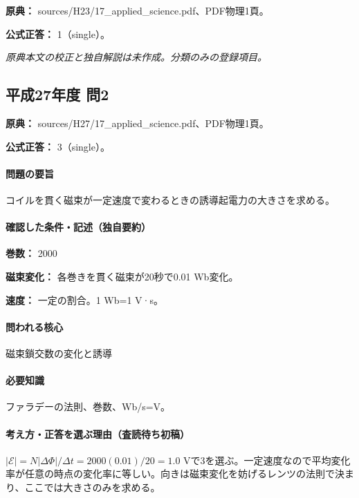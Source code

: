 \noindent\textbf{原典：} sources/H23/17\_applied\_science.pdf、PDF物理1頁。

\textbf{公式正答：} 1（single）。

\par\textit{原典本文の校正と独自解説は未作成。分類のみの登録項目。}

\subsection{平成27年度 問2}
\label{q:h27-reg-applied-02}

\noindent\textbf{原典：} sources/H27/17\_applied\_science.pdf、PDF物理1頁。

\textbf{公式正答：} 3（single）。

\paragraph{問題の要旨} コイルを貫く磁束が一定速度で変わるときの誘導起電力の大きさを求める。

\paragraph{確認した条件・記述（独自要約）}\mbox{}\par

\noindent\textbf{巻数：} 2000\par

\noindent\textbf{磁束変化：} 各巻きを貫く磁束が20秒で0.01 Wb変化。\par

\noindent\textbf{速度：} 一定の割合。1 Wb=\allowbreak{}1 V·s。\par

\paragraph{問われる核心} 磁束鎖交数の変化と誘導

\paragraph{必要知識} ファラデーの法則、巻数、Wb/s=\allowbreak{}V。

\paragraph{考え方・正答を選ぶ理由（査読待ち初稿）} \(|\mathcal E|=N|\Delta\Phi|/\Delta t=2000(0.01)/20=1.0\) Vで3を選ぶ。一定速度なので平均変化率が任意の時点の変化率に等しい。向きは磁束変化を妨げるレンツの法則で決まり、ここでは大きさのみを求める。

